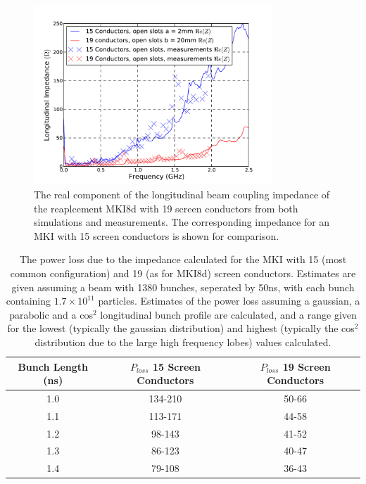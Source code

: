 \begin{figure}
\begin{center}
\includegraphics[width=0.8\textwidth]{LHC_MKI/figures/15_19_sims_measured_comparison.pdf}
\end{center}
\label{fig:mki-19-impedance}
\caption{The real component of the longitudinal beam coupling impedance of the reaplcement MKI8d with 19 screen conductors from both simulations and measurements. The corresponding impedance for an MKI with 15 screen conductors is shown for comparison.}
\end{figure}

\begin{table}
\label{tab:heating-15-19-cond}
\caption{The power loss due to the impedance calculated for the MKI with 15 (most common configuration) and 19 (as for MKI8d) screen conductors. Estimates are given assuming a beam with 1380 bunches, seperated by 50ns, with each bunch containing $1.7 \times 10^{11}$ particles. Estimates of the power loss assuming a gaussian, a parabolic and a cos$^{2}$ longitudinal bunch profile are calculated, and a range given for the lowest (typically the gaussian distribution) and highest (typically the cos$^{2}$ distribution due to the large high frequency lobes) values calculated.}
\begin{center}
\begin{tabular}{c | c | c}
Bunch Length (ns) & $P_{loss}$ 15 Screen Conductors & $P_{loss}$ 19 Screen Conductors \\ \hline
1.0 &  134-210 & 50-66 \\ \hline
1.1 &  113-171 & 44-58 \\ \hline
1.2 &  98-143 & 41-52 \\ \hline
1.3 &  86-123 & 40-47 \\ \hline
1.4 &  79-108 & 36-43 \\ \hline
\end{tabular}
\end{center}
\end{table}

